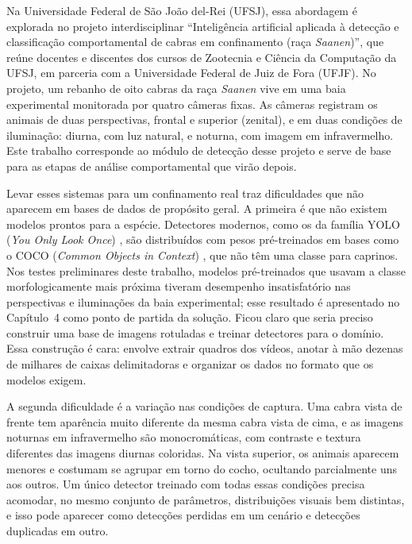 Na Universidade Federal de São João del-Rei (UFSJ), essa abordagem é explorada no projeto interdisciplinar ``Inteligência artificial aplicada à detecção e classificação comportamental de cabras em confinamento (raça \textit{Saanen})'', que reúne docentes e discentes dos cursos de Zootecnia e Ciência da Computação da UFSJ, em parceria com a Universidade Federal de Juiz de Fora (UFJF). No projeto, um rebanho de oito cabras da raça \textit{Saanen} vive em uma baia experimental monitorada por quatro câmeras fixas. As câmeras registram os animais de duas perspectivas, frontal e superior (zenital), e em duas condições de iluminação: diurna, com luz natural, e noturna, com imagem em infravermelho. Este trabalho corresponde ao módulo de detecção desse projeto e serve de base para as etapas de análise comportamental que virão depois.

Levar esses sistemas para um confinamento real traz dificuldades que não aparecem em bases de dados de propósito geral. A primeira é que não existem modelos prontos para a espécie. Detectores modernos, como os da família YOLO (\textit{You Only Look Once}) \cite{redmon2016yolo, jocher2023yolov8}, são distribuídos com pesos pré-treinados em bases como o COCO (\textit{Common Objects in Context}) \cite{journals/corr/LinMBHPRDZ14}, que não têm uma classe para caprinos. Nos testes preliminares deste trabalho, modelos pré-treinados que usavam a classe morfologicamente mais próxima tiveram desempenho insatisfatório nas perspectivas e iluminações da baia experimental; esse resultado é apresentado no Capítulo~4 como ponto de partida da solução. Ficou claro que seria preciso construir uma base de imagens rotuladas e treinar detectores para o domínio. Essa construção é cara: envolve extrair quadros dos vídeos, anotar à mão dezenas de milhares de caixas delimitadoras e organizar os dados no formato que os modelos exigem.

A segunda dificuldade é a variação nas condições de captura. Uma cabra vista de frente tem aparência muito diferente da mesma cabra vista de cima, e as imagens noturnas em infravermelho são monocromáticas, com contraste e textura diferentes das imagens diurnas coloridas. Na vista superior, os animais aparecem menores e costumam se agrupar em torno do cocho, ocultando parcialmente uns aos outros. Um único detector treinado com todas essas condições precisa acomodar, no mesmo conjunto de parâmetros, distribuições visuais bem distintas, e isso pode aparecer como detecções perdidas em um cenário e detecções duplicadas em outro.


